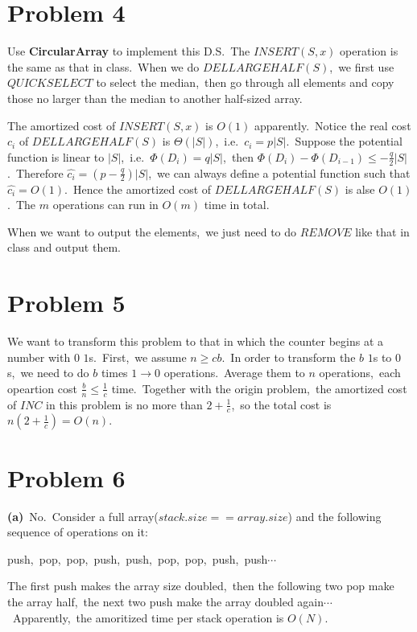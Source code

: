 \documentclass[]{article}
\begin{document}
    \section{Problem 4}
    Use \textbf{CircularArray} to implement this D.S.\ The $INSERT(S,x)$ operation is the same as that in class.\ When we do $DELLARGEHALF(S)$,\ we first use $QUICKSELECT$ to select the median,\ then go through all elements and copy those no larger than the median to another half-sized array.
    
    The amortized cost of $INSERT(S,x)$ is $O(1)$ apparently.\ Notice the real cost $c_i$ of $DELLARGEHALF(S)$ is $\Theta(|S|)$,\ i.e.\ $c_i = p|S|$.\ Suppose the potential function is linear to $|S|$,\ i.e.\ $\Phi(D_i) = q|S|$,\ then $\Phi(D_i) - \Phi(D_{i-1}) \leq -\frac{q}{2}|S|$.\ Therefore $\hat{c_i} = (p-\frac{q}{2})|S|$,\ we can always define a potential function such that $\hat{c_i} = O(1)$.\ Hence the amortized cost of $DELLARGEHALF(S)$ is alse $O(1)$.\ The $m$ operations can run in $O(m)$ time in total.
    
    When we want to output the elements,\ we just need to do $REMOVE$ like that in class and output them.  
    
    \section{Problem 5}
    We want to transform this problem to that in which the counter begins at a number with $0$ $1$s.\ First,\ we assume $n \geq cb$.\ In order to transform the $b$ $1$s to $0$s,\ we need to do $b$ times $1\to 0$ operations.\ Average them to $n$ operations,\ each opeartion cost $\frac{b}{n}\leq \frac{1}{c}$ time.\ Together with the origin problem,\ the amortized cost of $INC$ in this problem is no more than $2+\frac{1}{c}$,\ so the total cost is $n(2+\frac{1}{c}) = O(n)$.
    
    \section{Problem 6}
    \textbf{(a)}\ No.\ Consider a full array($stack.size == array.size$) and the following sequence of operations on it:
    
    push,\ pop,\ pop,\ push,\ push,\ pop,\ pop,\ push,\ push$\cdots$
    
    The first push makes the array size doubled,\ then the following two pop make the array half,\ the next two push make the array doubled again$\cdots$\ Apparently,\ the amoritized time per stack operation is $O(N)$.
    
\end{document}

